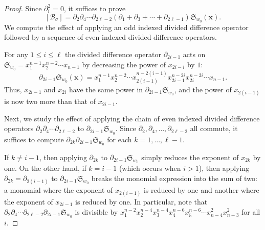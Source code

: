 \documentclass[11pt]{amsart}
\theoremstyle{remark}
\theoremstyle{remark}
\theoremstyle{definition}
\theoremstyle{definition}
\theoremstyle{definition}
\numberwithin{equation}{section}
\newcommand{\gs}{\sigma}
\newcommand{\cb}{\mathcal{B}}
\begin{document}
\begin{proof} Since $\partial_i^2=0$, it suffices to prove
\[
[\cb_\gs]=\partial_2\partial_4\cdots\partial_{2\ell-2}\left(\partial_1+\partial_3+\cdots+\partial_{2\ell-1}\right)\mathfrak{S}_{w_0} (\mathbf{x}).
\]
We compute the effect of applying an odd indexed divided difference operator followed by a sequence of even indexed divided difference operators. 

For any $1\leq i\leq \ell$ the divided difference operator $\partial_{2i-1}$ acts on $\mathfrak{S}_{w_0} = x_1^{n-1}x_2^{n-2}\cdots x_{n-1}$ by decreasing the power of $x_{2i-i}$ by $1$:
\[
\partial_{2 i-1}  \mathfrak{S}_{w_0}(\mathbf{x}) =x_1^{n-1} x_2^{n-2}\cdots x_{2(i-1)}^{n-2(i-1)} x_{2 i-1}^{n-2 i} x_{2 i}^{n-2 i} \cdots x_{n-1}.
\]
Thus, $x_{2i-1}$ and $x_{2i}$ have the same power in $\partial_{2 i-1}  \mathfrak{S}_{w_0}$, and the power of $x_{2(i-1)}$ is now two more than that of $x_{2i-1}$.

    
Next, we study the effect of applying the chain of even indexed divided difference operators $\partial_2\partial_4\cdots\partial_{2\ell-2}$ to  $\partial_{2 i-1} \mathfrak{S}_{w_0}$. Since $\partial_2, \partial_4, \ldots, \partial_{2\ell -2}$ all commute, it suffices to compute $\partial_{2k} \partial_{2i-1} \mathfrak{S}_{w_0}$ for each $k=1, \ldots, \ell -1$. 
    
If $k \neq i-1$, then applying $\partial_{2k}$ to $\partial_{2i-1} \mathfrak{S}_{w_0}$ simply reduces the exponent of $x_{2k}$ by one.  On the other hand, if $k=i-1$ (which occurs when $i>1$), then applying $\partial_{2k} = \partial_{2(i-1)}$ to $\partial_{2i-1} \mathfrak{S}_{w_0}$ breaks the monomial expression into the sum of two: a monomial where the exponent of $x_{2(i-1)}$ is reduced by one and another where the exponent of $x_{2i-1}$ is reduced by one. In particular, note that $\partial_{2}\partial_4\cdots \partial_{2\ell-2} \partial_{2i-1} \mathfrak{S}_{w_0}$ is divisible by $x_1^{n-2}x_2^{n-4}x_3^{n-4}x_4^{n-6}x_5^{n-6}\cdots x_{n-4}^2x_{n-3}^2$ for all $i$.


\end{proof}
\end{document}
